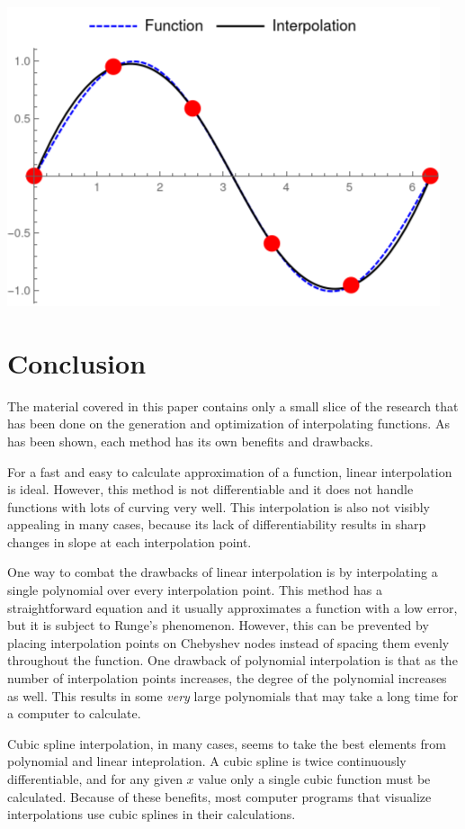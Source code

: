 \documentclass{article}
\begin{document}
{\begin{minipage}{0.3\textwidth}
        \includegraphics[width=\linewidth]{Images/SineInterpolation_Cubic/sin_interpolation_6.png}
        \captionsetup{justification=centering}
    \end{minipage}
}
\medbreak

\section{Conclusion}

The material covered in this paper contains only a small slice of the research that has been done on the generation and optimization of interpolating functions. As has been shown, each method has its own benefits and drawbacks.

For a fast and easy to calculate approximation of a function, linear interpolation is ideal. However, this method is not differentiable and it does not handle functions with lots of curving very well. This interpolation is also not visibly appealing in many cases, because its lack of differentiability results in sharp changes in slope at each interpolation point.

One way to combat the drawbacks of linear interpolation is by interpolating a single polynomial over every interpolation point. This method has a straightforward equation and it usually approximates a function with a low error, but it is subject to Runge's phenomenon. However, this can be prevented by placing interpolation points on Chebyshev nodes instead of spacing them evenly throughout the function. One drawback of polynomial interpolation is that as the number of interpolation points increases, the degree of the polynomial increases as well. This results in some \textit{very} large polynomials that may take a long time for a computer to calculate.

Cubic spline interpolation, in many cases, seems to take the best elements from polynomial and linear inteprolation. A cubic spline is twice continuously differentiable, and for any given $x$ value only a single cubic function must be calculated. Because of these benefits, most computer programs that visualize interpolations use cubic splines in their calculations.




\end{document}
